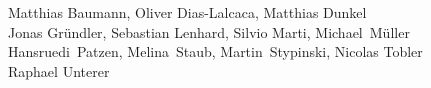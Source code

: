 %
%
%
Matthias Baumann,
Oliver Dias-Lalcaca,
Matthias Dunkel%
\\
Jonas Gründler,
Sebastian Lenhard,
Silvio Marti,
Michael~Müller%
\\
Hansruedi~Patzen,
Melina~Staub,
Martin~Stypinski,
Nicolas Tobler%
\\
Raphael Unterer
